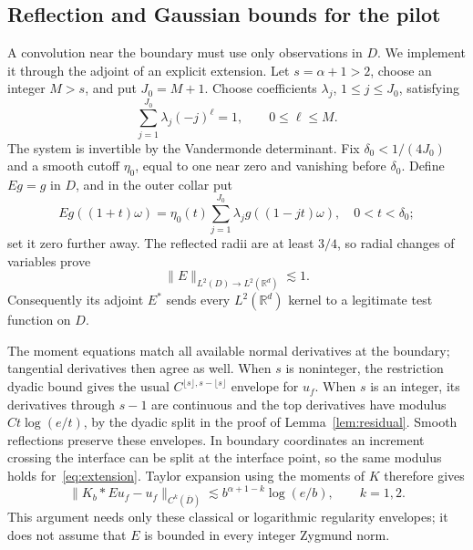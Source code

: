 \documentclass[11pt]{article}
\theoremstyle{remark}
\newcommand{\R}{\mathbb R}
\newcommand{\norm}[1]{\lVert #1\rVert}
\begin{document}
\subsection{Reflection and Gaussian bounds for the pilot}
A convolution near the boundary must use only observations in $D$. We implement it through the adjoint of an explicit extension. Let $s=\alpha+1>2$, choose an integer $M>s$, and put $J_0=M+1$. Choose coefficients $\lambda_j$, $1\le j\le J_0$, satisfying
\[
 \sum_{j=1}^{J_0}\lambda_j(-j)^\ell=1,\qquad 0\le\ell\le M.
\]
The system is invertible by the Vandermonde determinant. Fix $\delta_0<1/(4J_0)$ and a smooth cutoff $\eta_0$, equal to one near zero and vanishing before $\delta_0$. Define $Eg=g$ in $D$, and in the outer collar put
\begin{equation}\label{eq:extension}
 Eg((1+t)\omega)=\eta_0(t)\sum_{j=1}^{J_0}\lambda_j g((1-jt)\omega),
 \quad 0<t<\delta_0;
\end{equation}
set it zero further away. The reflected radii are at least $3/4$, so radial changes of variables prove
\begin{equation}\label{eq:Ebounded}
 \norm E_{L^2(D)\to L^2(\R^d)}\lesssim1.
\end{equation}
Consequently its adjoint $E^*$ sends every $L^2(\R^d)$ kernel to a legitimate test function on $D$.

The moment equations match all available normal derivatives at the boundary; tangential derivatives then agree as well. When $s$ is noninteger, the restriction dyadic bound gives the usual $C^{\lfloor s\rfloor,s-\lfloor s\rfloor}$ envelope for $u_f$. When $s$ is an integer, its derivatives through $s-1$ are continuous and the top derivatives have modulus $Ct\log(e/t)$, by the dyadic split in the proof of Lemma~\ref{lem:residual}. Smooth reflections preserve these envelopes. In boundary coordinates an increment crossing the interface can be split at the interface point, so the same modulus holds for~\eqref{eq:extension}. Taylor expansion using the moments of $K$ therefore gives
\begin{equation}\label{eq:pilotbias}
 \norm{K_b*Eu_f-u_f}_{C^k(\overline D)}
 \lesssim b^{\alpha+1-k}\log(e/b),\qquad k=1,2.
\end{equation}
This argument needs only these classical or logarithmic regularity envelopes; it does not assume that $E$ is bounded in every integer Zygmund norm.
\end{document}
